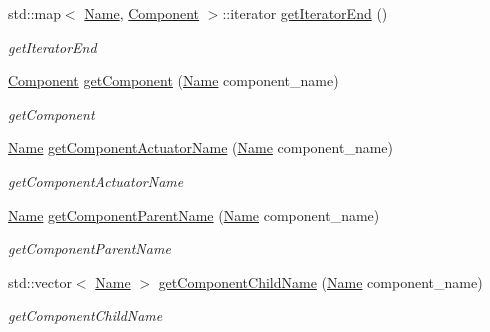 \begin{DoxyCompactItemize}
std\+::map$<$ \hyperlink{namespacerobotis__manipulator_a08c2d25e77a01ad75b9bb740f8ce4765}{Name}, \hyperlink{structrobotis__manipulator_1_1_component}{Component} $>$\+::iterator \hyperlink{classrobotis__manipulator_1_1_manipulator_ae600869bf358724f53241eb5f061ea78}{get\+Iterator\+End} ()
\begin{DoxyCompactList}\small\item\em get\+Iterator\+End \end{DoxyCompactList}\item 
\hyperlink{structrobotis__manipulator_1_1_component}{Component} \hyperlink{classrobotis__manipulator_1_1_manipulator_a38623495d8fb45236c6acf119f388abf}{get\+Component} (\hyperlink{namespacerobotis__manipulator_a08c2d25e77a01ad75b9bb740f8ce4765}{Name} component\+\_\+name)
\begin{DoxyCompactList}\small\item\em get\+Component \end{DoxyCompactList}\item 
\hyperlink{namespacerobotis__manipulator_a08c2d25e77a01ad75b9bb740f8ce4765}{Name} \hyperlink{classrobotis__manipulator_1_1_manipulator_a371446cbf4d2d5a572b173d713305fb1}{get\+Component\+Actuator\+Name} (\hyperlink{namespacerobotis__manipulator_a08c2d25e77a01ad75b9bb740f8ce4765}{Name} component\+\_\+name)
\begin{DoxyCompactList}\small\item\em get\+Component\+Actuator\+Name \end{DoxyCompactList}\item 
\hyperlink{namespacerobotis__manipulator_a08c2d25e77a01ad75b9bb740f8ce4765}{Name} \hyperlink{classrobotis__manipulator_1_1_manipulator_aa1401774b97703aead9174595742b7bd}{get\+Component\+Parent\+Name} (\hyperlink{namespacerobotis__manipulator_a08c2d25e77a01ad75b9bb740f8ce4765}{Name} component\+\_\+name)
\begin{DoxyCompactList}\small\item\em get\+Component\+Parent\+Name \end{DoxyCompactList}\item 
std\+::vector$<$ \hyperlink{namespacerobotis__manipulator_a08c2d25e77a01ad75b9bb740f8ce4765}{Name} $>$ \hyperlink{classrobotis__manipulator_1_1_manipulator_a21d1f387435215c3675517581cf225dd}{get\+Component\+Child\+Name} (\hyperlink{namespacerobotis__manipulator_a08c2d25e77a01ad75b9bb740f8ce4765}{Name} component\+\_\+name)
\begin{DoxyCompactList}\small\item\em get\+Component\+Child\+Name \end{DoxyCompactList}\item 

\end{DoxyCompactItemize}
